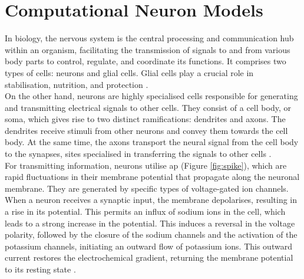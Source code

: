 \chapter{Computational Neuron Models}
\label{ch3}
In biology, the nervous system is the central 
processing and communication hub within an 
organism, facilitating the transmission of 
signals to and from various body parts to 
control, regulate, and coordinate its functions. 
It comprises two types of cells: neurons and 
glial cells. Glial cells play a crucial role in 
stabilisation, nutrition, and 
protection \cite{Jessen}.\\
On the other hand, neurons are highly 
specialised cells responsible for generating 
and transmitting electrical signals to other 
cells. They consist of a cell body, or 
soma, which gives rise to two distinct 
ramifications: dendrites and axons. The dendrites 
receive stimuli from other neurons and 
convey them towards the cell 
body. At the same time, the axons transport the 
neural signal from the cell body to the synapses,
sites specialised in 
transferring the signals to other 
cells \cite{Dayan}.\\

For transmitting information, neurons utilise 
\acrfull{ap} (Figure \ref{fig:spike}), 
which are rapid fluctuations in their membrane 
potential that propagate along 
the neuronal membrane. They are generated by 
specific types of 
voltage-gated ion channels.\\
When a neuron receives a 
synaptic input, the membrane depolarises, 
resulting in a rise in its potential. This 
permits an influx of sodium 
ions in the cell, which leads to a strong 
increase in 
the potential. This induces a reversal 
in the voltage polarity, followed by the closure 
of the sodium channels and the activation of the
potassium channels, initiating an outward flow 
of potassium ions. This outward current restores 
the electrochemical gradient, returning the 
membrane potential to its resting 
state \cite{Dayan}.\\

